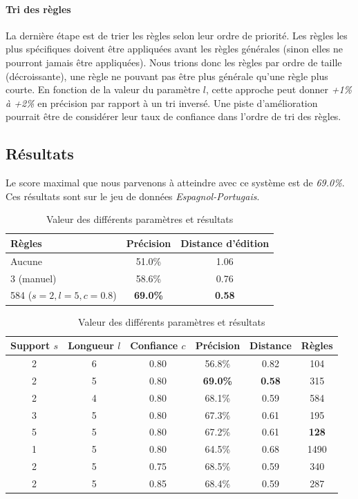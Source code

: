 \documentclass{article}
\begin{document}
\paragraph{Tri des règles}
La dernière étape est de trier les règles selon leur ordre de priorité. Les règles les plus spécifiques doivent être appliquées avant les règles générales (sinon elles ne pourront jamais être appliquées). Nous trions donc les règles par ordre de taille (décroissante), une règle ne pouvant pas être plus générale qu'une règle plus courte. En fonction de la valeur du paramètre $l$, cette approche peut donner \emph{+1\% à +2\%} en précision par rapport à un tri inversé.
Une piste d'amélioration pourrait être de considérer leur taux de confiance dans l'ordre de tri des règles.

\subsection{Résultats}
Le score maximal que nous parvenons à atteindre avec ce système est de \emph{69.0\%}. Ces résultats sont sur le jeu de données \emph{Espagnol-Portugais}.
\begin{table}[H]
\caption{Types de règles et résultats}
\begin{center}
\begin{tabular}{|l|c|c|}
\hline
Règles&Précision&Distance d'édition\\
\hline
Aucune&51.0\%&1.06\\
\hline
3 (manuel)&58.6\%&0.76\\
\hline
584 ($s=2, l=5, c=0.8$)&\textbf{69.0\%}&\textbf{0.58}\\
\hline
\end{tabular}
\end{center}

\caption{Valeur des différents paramètres et résultats}
\begin{center}
\begin{tabular}{|c|c|c||c|c|c|}
\hline
Support $s$&Longueur $l$&Confiance $c$&Précision&Distance&Règles\\
\hline
2&6&0.80&56.8\%&0.82&104\\
\hline
2&5&0.80&\textbf{69.0\%}&\textbf{0.58}&315\\
\hline
2&4&0.80&68.1\%&0.59&584\\
\hline
\hline
3&5&0.80&67.3\%&0.61&195\\
\hline
5&5&0.80&67.2\%&0.61&\textbf{128}\\
\hline
1&5&0.80&64.5\%&0.68&1490\\
\hline
\hline
2&5&0.75&68.5\%&0.59&340\\
\hline
2&5&0.85&68.4\%&0.59&287\\
\hline
\end{tabular}
\end{center}
\end{table}
\end{document}
